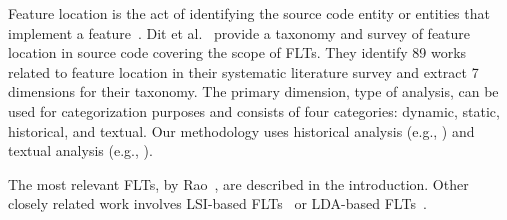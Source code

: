 Feature location is the act of identifying the source code entity or entities
that implement a feature~\cite{Rajlich-Wilde:2002}.
Dit et al.~\cite{Dit-etal:2011} provide a taxonomy and survey of feature
location in source code covering the scope of FLTs.  They identify 89 works
related to feature location in their systematic literature survey and extract
7 dimensions for their taxonomy.  The primary dimension, type of analysis, can
be used for categorization purposes and consists of four categories: dynamic,
static, historical, and textual.
Our methodology uses historical analysis (e.g., \cite{Cubranic-etal:2005}) and textual analysis (e.g., \cite{Marcus-etal:2004}).

The most relevant FLTs, by Rao~\cite{Rao-etal:2013, Rao:2013}, are described in the introduction.
Other closely related work involves LSI-based FLTs~\cite{Marcus-etal:2004,Poshyvanyk-etal:2006,Poshyvanyk-Marcus:2007,Liu-etal:2007,Scanniello-Marcus:2011,Cubranic-etal:2005} or LDA-based FLTs~\cite{Lukins-etal:2008,Lukins-etal:2010,Biggers-etal:2014,Bassett-Kraft:2013}.



